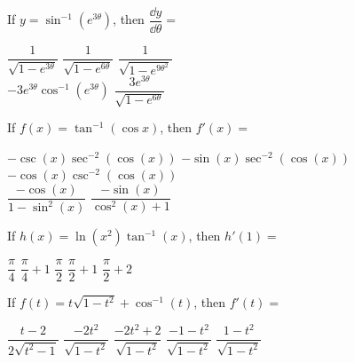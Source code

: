\begin{questions}
    \question If $y = \sin^{-1} \left(e^{3\theta}\right)$, then $\dfrac{\dd y}{\dd \theta} = $ \\

    \begin{oneparchoices}
        \choice $\dfrac{1}{\sqrt{1 - e^{3\theta}}}$
        \choice $\dfrac{1}{\sqrt{1 - e^{6\theta}}}$
        \choice $\dfrac{1}{\sqrt{1 - e^{9\theta^2}}}$ \\[11pt]
        \makebox[0.2 \textwidth] \choice $-3e^{3\theta}\cos^{-1} \left(e^{3\theta}\right)$ 
        \makebox[0.25 \textwidth] \choice $\dfrac{3e^{3\theta}}{\sqrt{1 - e^{6\theta}}}$
    \end{oneparchoices} \par \horizontalline

    \question If $f(x) = \tan^{-1}(\cos x)$, then $f'(x) = $ \\

    \begin{oneparchoices}
        \choice $-\csc (x)\sec^{-2} (\cos (x))$
        \choice $-\sin (x)\sec^{-2} (\cos (x))$
        \choice $-\cos (x)\csc^{-2} (\cos (x))$ \\[11pt] 
        \makebox[0.23 \textwidth] \choice $\dfrac{-\cos (x)}{1 - \sin^2(x)}$
        \makebox[0.25 \textwidth] \choice $\dfrac{-\sin (x)}{\cos^2 (x) + 1}$
    \end{oneparchoices} \par \horizontalline

    \question If $h(x) = \ln \left(x^2\right)\tan^{-1} (x)$, then $h'(1) = $ \\

    \begin{oneparchoices}
        \choice $\dfrac{\pi}{4}$
        \choice $\dfrac{\pi}{4} + 1$
        \choice $\dfrac{\pi}{2}$
        \choice $\dfrac{\pi}{2} + 1$
        \choice $\dfrac{\pi}{2} + 2$
    \end{oneparchoices} \par \horizontalline

    \question If $f(t) = t\sqrt{1 - t^2} + \cos^{-1} (t)$, then $f'(t) = $ \\

    \begin{oneparchoices}
        \choice $\dfrac{t - 2}{2\sqrt{t^2 - 1}}$
        \choice $\dfrac{-2t^2}{\sqrt{1 - t^2}}$
        \choice $\dfrac{-2t^2 + 2}{\sqrt{1 - t^2}}$
        \choice $\dfrac{-1 - t^2}{\sqrt{1 - t^2}}$
        \choice $\dfrac{1 - t^2}{\sqrt{1 - t^2}}$
    \end{oneparchoices} \par \horizontalline


\end{questions}
